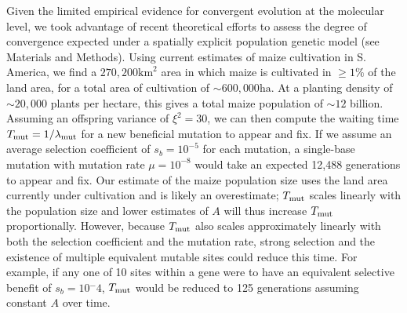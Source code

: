 Given the limited empirical evidence for convergent evolution at the molecular level, we took advantage of recent theoretical efforts \cite[]{ralph2014convergent} to assess the degree of convergence expected under a spatially explicit population genetic model (see Materials and Methods).
Using current estimates of maize cultivation in S. America, we find a $270,200\text{km}^2$ area in which maize is cultivated in $\ge 1\%$ of the land area, for a total area of cultivation of $\sim 600,000 \text{ha}$.  
At a planting density of $\sim 20,000$ plants per hectare, this gives a total maize population of $\sim 12$ billion. 
Assuming an offspring variance of $\xi^2 = 30$, we can then compute the waiting time $T_{\text{mut}}=1/\lambda_{\text{mut}}$ for a new beneficial mutation to appear and fix.
If we assume an average selection coefficient of $s_b=10^{-5}$ for each mutation, a single-base mutation with mutation rate $\mu=10^{-8}$ would take an expected 12,488 generations to appear and fix.
Our estimate of the maize population size uses the land area currently under cultivation and is likely an overestimate; $T_{\text{mut}}$ scales linearly with the population size and lower estimates of $A$ will thus increase $T_{\text{mut}}$ proportionally.
However, because $T_{\text{mut}}$ also scales approximately linearly with both the selection coefficient and the mutation rate, strong selection and the existence of multiple equivalent mutable sites could reduce this time. 
For example, if any one of 10 sites within a gene were to have an equivalent selective benefit of $s_b=10{^-4}$, $T_{\text{mut}}$ would be reduced to 125 generations assuming constant $A$ over time. 


